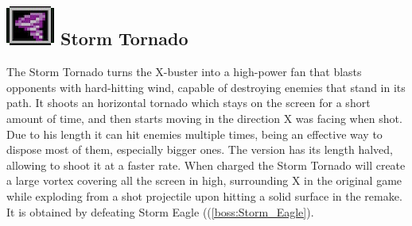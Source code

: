 \subsection{\includegraphics[scale=0.2]{figures/X1/Storm_eagle/Storm_T.png} Storm Tornado}\label{Storm_tornado}
The Storm Tornado turns the X-buster into a high-power fan that blasts opponents with hard-hitting wind, capable of destroying enemies that stand in its path. It shoots an horizontal tornado which stays on the screen for a short amount of time, and then starts moving in the direction X was facing when shot. Due to his length it can hit enemies multiple times, being an effective way to dispose most of them, especially bigger ones.  The \mhx version has its length halved, allowing to shoot it at a faster rate. When charged the Storm Tornado will create a large vortex covering all the screen in high, surrounding X in the original game while exploding from a shot projectile upon hitting a solid surface in the remake.\cite{wiki:Storm_tornado} It is obtained by defeating Storm Eagle ((\ref{boss:Storm_Eagle}).
